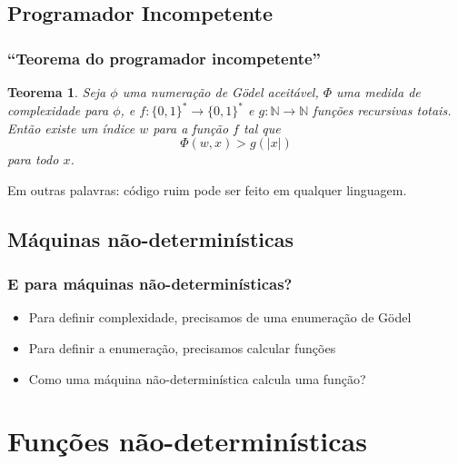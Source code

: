 \documentclass[utf8,notheorems]{beamer}
\newtheorem*{theorem}{Teorema}
\theoremstyle{definition}
\begin{document}
\subsection{Programador Incompetente}
\begin{frame}
    \frametitle{``Teorema do programador incompetente''}
    \begin{theorem}
        Seja $\phi$ uma numeração de Gödel aceitável,
        $\Phi$ uma medida de complexidade para $\phi$,
        e $f: \{0, 1\}^* \to \{0, 1\}^*$ e $g: \mathbb N \to \mathbb N$
        funções recursivas totais.
        Então existe um índice $w$ para a função $f$ tal que
        \begin{equation*}
            \Phi(w, x) > g(|x|)
        \end{equation*}
        para todo $x$.
    \end{theorem}

    \pause
    Em outras palavras: código ruim pode ser feito em qualquer linguagem.
\end{frame}

\subsection{Máquinas não-determinísticas}
\begin{frame}
    \frametitle{E para máquinas não-determinísticas?}

    \begin{itemize}
        \item Para definir complexidade, precisamos de uma enumeração de Gödel
        \item Para definir a enumeração, precisamos calcular funções
        \item Como uma máquina não-determinística calcula uma função?
    \end{itemize}
\end{frame}

\section{Funções não-determinísticas}
\end{document}
